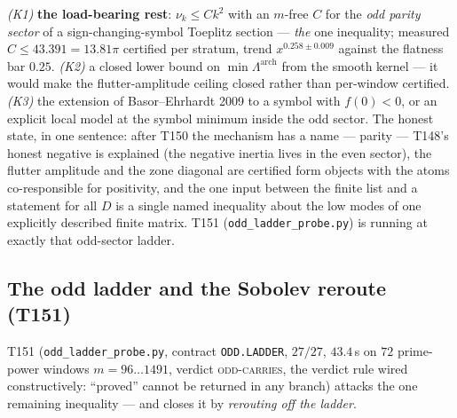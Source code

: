 \documentclass[11pt,a4paper]{article}
\begin{document}
\begin{keybox}
\emph{(K1)} \textbf{the load-bearing rest}: $\nu_k\le Ck^2$ with an $m$-free $C$ for the
\emph{odd parity sector} of a sign-changing-symbol Toeplitz section --- \emph{the} one
inequality; measured $C\le43.391=13.81\pi$ certified per stratum, trend $x^{0.258\pm0.009}$
against the flatness bar $0.25$. \emph{(K2)} a closed lower bound on
$\min\Lambda^{\mathrm{arch}}$ from the smooth kernel --- it would make the flutter-amplitude
ceiling closed rather than per-window certified. \emph{(K3)} the extension of Basor--Ehrhardt
2009 to a symbol with $f(0)<0$, or an explicit local model at the symbol minimum inside the odd
sector. The honest state, in one sentence: after T150 the mechanism has a name --- parity ---
T148's honest negative is explained (the negative inertia lives in the even sector), the
flutter amplitude and the zone diagonal are certified form objects with the atoms
co-responsible for positivity, and the one input between the finite list and a statement for
all $D$ is a single named inequality about the low modes of one explicitly described finite
matrix.
T151 (\texttt{odd\_ladder\_probe.py}) is running at exactly that odd-sector ladder.
\end{keybox}

\subsection{The odd ladder and the Sobolev reroute (T151)}
T151 (\texttt{odd\_ladder\_probe.py}, contract \texttt{ODD.LADDER}, $27/27$, $43.4$\,s on
$72$ prime-power windows $m=96\ldots1491$, verdict \textsc{odd-carries}, the verdict rule
wired constructively: ``proved'' cannot be returned in any branch) attacks the one remaining
inequality --- and closes it by \emph{rerouting off the ladder}.
\end{document}
